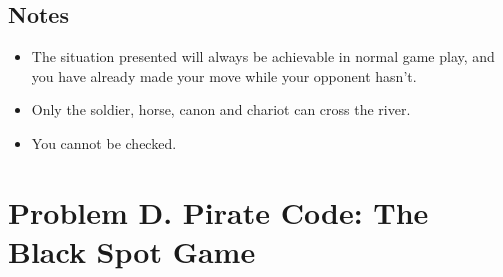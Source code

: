 \documentclass[12pt,a4paper]{article}
\begin{document}
\subsection*{\fontsize{16}{12}Notes}
\begin{itemize}
\item  The situation presented will always be achievable in normal game play, and you have already made your move while your opponent hasn't.
\item Only the soldier, horse, canon and chariot can
cross the river.
\item You cannot be checked.
\end{itemize}

\newpage

\section*{\fontsize{18}{12}Problem D. Pirate Code: The Black Spot Game}
\end{document}
